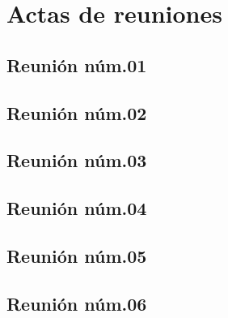\documentclass[10pt,spanish]{article}
\let\stdsection\section
\renewcommand\section{\newpage\stdsection}
\begin{document}

\section{Actas de reuniones}
\label{anex:actasReuniones}


\subsection{Reunión núm.01}\label{subsec:r1}
\label{anex:actaReunion1}

\newpage

\subsection{Reunión núm.02}\label{subsec:r2}
\label{anex:actaReunion2}

\newpage

\subsection{Reunión núm.03}\label{subsec:r3}
\label{anex:actaReunion3}

\newpage

\subsection{Reunión núm.04}\label{subsec:r4}
\label{anex:actaReunion4}

\newpage

\subsection{Reunión núm.05}\label{subsec:r5}
\label{anex:actaReunion5}

\newpage

\subsection{Reunión núm.06}\label{subsec:r6}
\label{anex:actaReunion6}

\newpage
\end{document}
